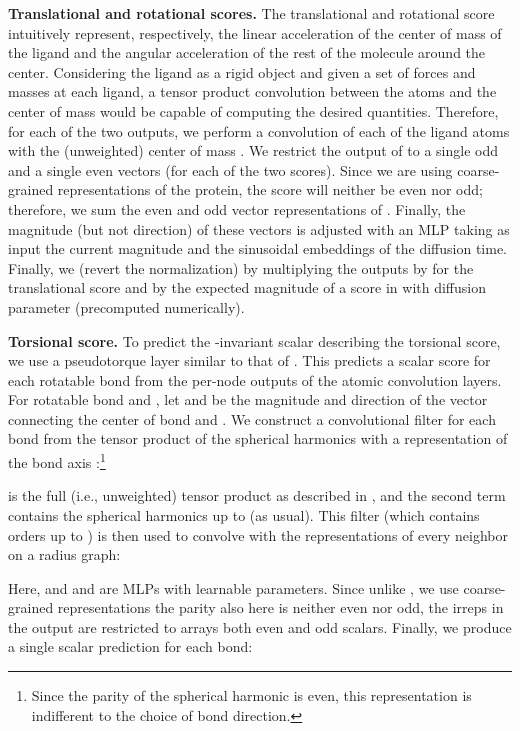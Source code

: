 \documentclass{article} \usepackage{iclr2023_conference,times}
\begin{document}
\textbf{Translational and rotational scores.} The translational and rotational score intuitively represent, respectively, the linear acceleration of the center of mass of the ligand and the angular acceleration of the rest of the molecule around the center. Considering the ligand as a rigid object and given a set of forces and masses at each ligand, a tensor product convolution between the atoms and the center of mass would be capable of computing the desired quantities. Therefore, for each of the two outputs, we perform a convolution of each of the ligand atoms with the (unweighted) center of mass . 
We restrict the output of  to a single odd and a single even vectors (for each of the two scores). Since we are using coarse-grained representations of the protein, the score will neither be even nor odd; therefore, we sum the even and odd vector representations of . Finally, the magnitude (but not direction) of these vectors is adjusted with an MLP taking as input the current magnitude and the sinusoidal embeddings of the diffusion time. Finally, we (revert the normalization) by multiplying the outputs by  for the translational score and by the expected magnitude of a score in  with diffusion parameter  (precomputed numerically). 

\textbf{Torsional score. } To predict the  -invariant scalar describing the torsional score, we use a pseudotorque layer similar to that of \citet{jing2022torsional}. This predicts a scalar score  for each rotatable bond from the per-node outputs of the atomic convolution layers. For rotatable bond  and , let  and  be the magnitude and direction of the vector connecting the center of bond  and . We construct a convolutional filter  for each bond  from the tensor product of the spherical harmonics with a  representation of the {bond axis} :\footnote{Since the parity of the  spherical harmonic is even, this representation is indifferent to the choice of bond direction.}

 is the full (i.e., unweighted) tensor product as described in \citet{geiger2022e3nn}, and the second term contains the spherical harmonics up to  (as usual). This filter (which contains orders up to ) is then used to convolve with the representations of every neighbor on a radius graph:

Here,  and  and  are MLPs with learnable parameters. Since unlike \citet{jing2022torsional}, we use coarse-grained representations the parity also here is neither even nor odd, the irreps in the output are restricted to arrays both even  and odd  scalars. Finally, we produce a single scalar prediction for each bond:
\end{document}
